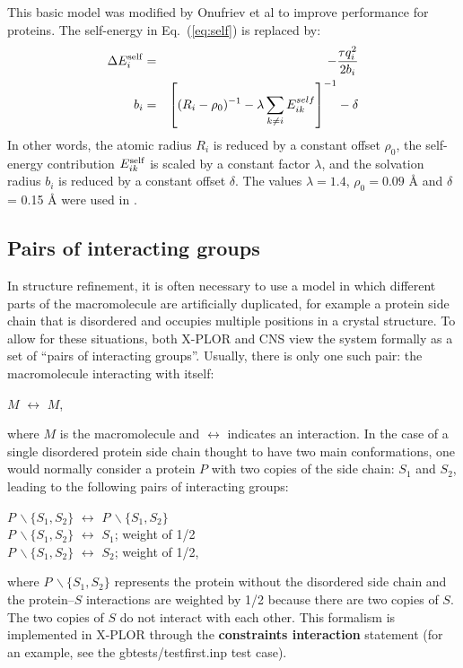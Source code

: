\documentclass[12pt]{report}
\begin{document}
This basic model was modified by Onufriev et al \cite{Onufriev00} to improve performance
for proteins. The self-energy in Eq.\ (\ref{eq:self}) is replaced by:
\begin{eqnarray} 
\Delta E_i^{\rm self} &=& -\frac{\tau q_i^2}{2 b_i} \\
b_i &=& \left[ (R_i - \rho_0)^{-1} 
               - \lambda \sum_{k \neq i} E_{ik}^{self} \right]^{-1} - \delta
 \label{eq:selfnew}
\end{eqnarray}
In other words, the atomic radius $R_i$ is reduced by a constant offset $\rho_0$,
the self-energy contribution $E_{ik}^{\rm self}$ is scaled by a constant factor $\lambda$,
and the solvation radius $b_i$ is reduced by a constant offset $\delta$. The values
$\lambda = 1.4$, $\rho_0 = 0.09$ {\AA} and $\delta$ = 0.15 {\AA} were used in
\cite{Onufriev00}.

\subsection{Pairs of interacting groups}
In structure refinement, it is often necessary to use a model in which
different parts of the macromolecule are artificially duplicated, for example
a protein side chain that is disordered and occupies multiple positions in a
crystal structure. To allow for these situations, both X-PLOR \cite{Xplor} and
CNS \cite{CNS} view the system formally as a set of ``pairs of interacting
groups''. Usually, there is only one such pair: the macromolecule
interacting with itself:
\begin{center} $M$ $\leftrightarrow$ $M$, \end{center}
where $M$ is the macromolecule and $\leftrightarrow$ indicates an interaction. In the
case of a single disordered protein side chain thought to have two main conformations,
one would normally consider a protein $P$ with two copies of the side chain: $S_1$ and $S_2$,
leading to the following pairs of interacting groups:
\begin{center}
$P \, \backslash \{S_1, S_2\}$ $\leftrightarrow$ $P \, \backslash \{S_1, S_2\}$ \\
$P \, \backslash \{S_1, S_2\}$ $\leftrightarrow$ $S_1$; weight of 1/2 \\
$P \, \backslash \{S_1, S_2\}$ $\leftrightarrow$ $S_2$; weight of 1/2,
\end{center}
where $P \, \backslash \{S_1, S_2\}$ represents the protein without the disordered side
chain and the protein--$S$ interactions are weighted by 1/2 because there
are two copies of $S$. The two copies of $S$ do not interact with each other.
This formalism is implemented in X-PLOR through the {\bf constraints interaction}
statement (for an example, see the gbtests/testfirst.inp test case).
\end{document}
